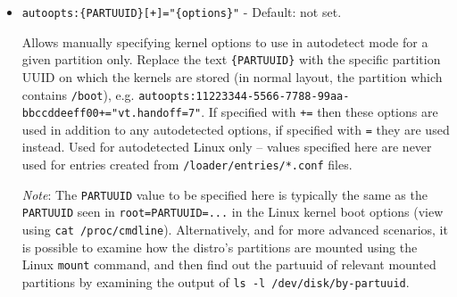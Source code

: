 \documentclass[]{article}
\begin{document}
\begin{itemize}
\begin{itemize}
    \item \texttt{0x00002000} (bit \texttt{13}) --- \texttt{LINUX\_BOOT\_ALLOW\_CONF\_AUTO\_ROOT},
    In some instances of \texttt{BootLoaderSpecByDefault} in combination with \texttt{ostree}, the
    \texttt{/loader/entries/*.conf} files do not specify a required \texttt{root=...} kernel
    option -- it is added by GRUB. If this bit is set and this situation is detected, then
    automatically add this option. (Required for example by Endless OS.)
    \item \texttt{0x00004000} (bit \texttt{14}) --- \texttt{LINUX\_BOOT\_LOG\_VERBOSE},
    Add additional debug log info about files encountered and autodetect options added while scanning for
    Linux boot entries.
    \item \texttt{0x00008000} (bit \texttt{15}) --- \texttt{LINUX\_BOOT\_ADD\_DEBUG\_INFO},
    Adds a human readable file system type, followed by the first eight characters of the
    partition's unique partition uuid, to each generated entry name. Can help with debugging
    the origin of entries generated by the driver when there are multiple Linux installs on
    one system.
  \end{itemize} \medskip

  Flag values can be specified in hexadecimal beginning with \texttt{0x} or in decimal,
  e.g. \texttt{flags=0x80} or \texttt{flags=128}. It is also possible to specify flags to
  add or remove, using syntax such as \texttt{flags+=0xC000} to add all debugging
  options or \texttt{flags-=0x400} to remove the \texttt{LINUX\_BOOT\_ADD\_RO} option. \medskip

  \item \texttt{autoopts:\{PARTUUID\}[+]="\{options\}"} - Default: not set. \medskip

  Allows manually specifying kernel options to use in autodetect mode for a given partition only.
  Replace the text \texttt{\{PARTUUID\}} with the specific partition UUID on which the kernels are stored
  (in normal layout, the partition which contains \texttt{/boot}),
  e.g. \texttt{autoopts:11223344-5566-7788-99aa-bbccddeeff00+="vt.handoff=7"}.
  If specified with \texttt{+=} then these options are used in addition to any autodetected options, if specified
  with \texttt{=} they are used instead. Used for autodetected Linux only -- values specified here are never
  used for entries created from \texttt{/loader/entries/*.conf} files.
  \medskip

  \emph{Note}: The \texttt{PARTUUID} value to be specified here is typically the same as the \texttt{PARTUUID}
  seen in \texttt{root=PARTUUID=...} in the Linux kernel boot options (view using
  \texttt{cat /proc/cmdline}). Alternatively, and
  for more advanced scenarios, it is possible to examine how the distro's partitions are mounted using the
  Linux \texttt{mount} command, and then find out the partuuid of relevant mounted partitions by examining the
  output of \texttt{ls -l /dev/disk/by-partuuid}. \medskip


\end{itemize}
\end{document}
